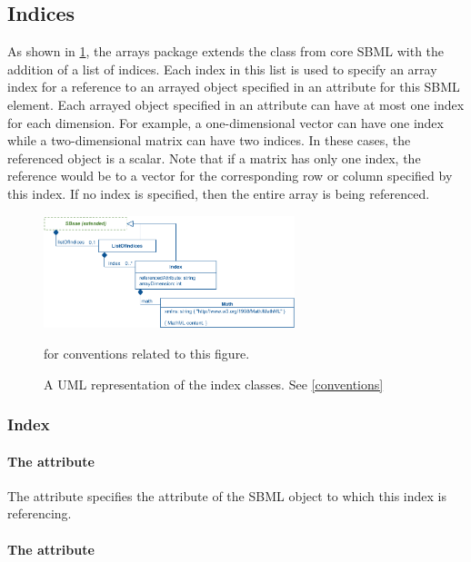 \subsection{Indices}

As shown in \ref{fig:indices_uml}, the arrays package extends the \SBase class from core SBML with the addition of a list of indices.  Each index in this list is used to specify an array index for a reference to an arrayed object specified in an attribute for this SBML element.    Each arrayed object specified in an attribute can have at most one index for each dimension.  For example, a one-dimensional vector can have one index while a two-dimensional matrix can have two indices.  In these cases, the referenced object is a scalar.  Note that if a matrix has only one index, the reference would be to a vector for the corresponding row or column specified by this index.  If no index is specified, then the entire array is being referenced.  

\begin{figure}[tbhp]
  \centering
  \includegraphics[width=0.65\textwidth]{images/indicesUML.pdf}\\
  \caption{A UML representation of the index classes. See \ref{conventions}} for conventions related to this figure. \label{fig:indices_uml}
\end{figure}

\subsubsection{Index}
\label{sec:index}

\paragraph{The  attribute}

The  attribute specifies the attribute of the SBML object to which this index is referencing.  

\paragraph{The  attribute}

